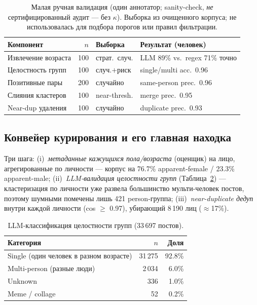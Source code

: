 \documentclass[journal]{IEEEtran}
\begin{document}
\begin{table}[!t]
\renewcommand{\arraystretch}{1.15}
\caption{Малая ручная валидация (один аннотатор; sanity-check, \emph{не} сертифицированный аудит --- без $\kappa$). Выборка из очищенного корпуса; не использовалась для подбора порогов или правил фильтрации.}
\label{tab:humanval}
\centering
\footnotesize
\setlength{\tabcolsep}{3.5pt}%
\begin{tabular}{@{}lrll@{}}
\toprule
Компонент & $n$ & Выборка & Результат (человек) \\
\midrule
Извлечение возраста & 100 & страт.\ случ. & LLM 89\% vs.\ regex 71\% точно \\
Целостность групп & 100 & случ.$+$риск & single/multi acc.\ 0.96 \\
Позитивные пары & 200 & случайно & same-person prec.\ 0.96 \\
Слияния кластеров & 100 & near-thresh. & merge prec.\ 0.95 \\
Near-dup удаления & 100 & случайно & duplicate prec.\ 0.93 \\
\bottomrule
\end{tabular}
\end{table}

\subsection{Конвейер курирования и его главная находка}\label{sec:data-curation}
Три шага: (i)~\emph{метаданные кажущихся пола/возраста} (оценщик) на лицо, агрегированные по личности --- корпус на 76.7\% apparent-female / 23.3\% apparent-male; (ii)~\emph{LLM-валидация целостности групп} (Таблица~\ref{tab:integrity}) --- кластеризация по личности уже развела большинство мульти-человек постов, поэтому шумными помечены лишь 421 person-группа; (iii)~\emph{near-duplicate дедуп} внутри каждой личности (cos $\geq$ 0.97), убирающий 8\,190 лиц ($\approx$17\%).

\begin{table}[!t]
\renewcommand{\arraystretch}{1.2}
\caption{LLM-классификация целостности групп (33\,697 постов).}
\label{tab:integrity}
\centering
\footnotesize
\begin{tabular}{@{}lrr@{}}
\toprule
Категория & $n$ & Доля \\
\midrule
Single (один человек в разном возрасте) & 31\,275 & 92.8\% \\
Multi-person (разные люди) & 2\,034 & 6.0\% \\
Unknown & 336 & 1.0\% \\
Meme / collage & 52 & 0.2\% \\
\bottomrule
\end{tabular}
\end{table}
\end{document}
